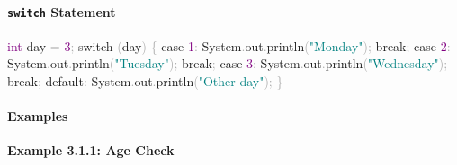 \documentclass[
  justified,
  openright,
]{tufte-book}
\let\subsubsection\paragraph
\let\paragraph\paragraph
\newcommand{\BuiltInTok}[1]{#1}
\newcommand{\ControlFlowTok}[1]{\textcolor{BrandBlue}{#1}}
\newcommand{\DataTypeTok}[1]{\textcolor{Purple}{#1}}
\newcommand{\DecValTok}[1]{\textcolor{Purple}{#1}}
\newcommand{\FunctionTok}[1]{\textcolor{BrandBlue}{#1}}
\newcommand{\KeywordTok}[1]{\textcolor{BrandBlue}{#1}}
\newcommand{\NormalTok}[1]{#1}
\newcommand{\OperatorTok}[1]{\textcolor{DarkGray}{#1}}
\newcommand{\StringTok}[1]{\textcolor{Teal}{#1}}
\newenvironment{Shaded}{%
  \begin{snugshade}
}{%
  \end{snugshade}
}
\let\subsubsection\paragraph
\let\paragraph\paragraph
\begin{document}
\subsubsection{\texorpdfstring{\texttt{switch}
Statement}{switch Statement}}\label{switch-statement}

\begin{Shaded}
\begin{Highlighting}[]
\DataTypeTok{int}\NormalTok{ day }\OperatorTok{=} \DecValTok{3}\OperatorTok{;}
\ControlFlowTok{switch} \OperatorTok{(}\NormalTok{day}\OperatorTok{)} \OperatorTok{\{}
    \ControlFlowTok{case} \DecValTok{1}\OperatorTok{:}
        \BuiltInTok{System}\OperatorTok{.}\FunctionTok{out}\OperatorTok{.}\FunctionTok{println}\OperatorTok{(}\StringTok{"Monday"}\OperatorTok{);}
        \ControlFlowTok{break}\OperatorTok{;}
    \ControlFlowTok{case} \DecValTok{2}\OperatorTok{:}
        \BuiltInTok{System}\OperatorTok{.}\FunctionTok{out}\OperatorTok{.}\FunctionTok{println}\OperatorTok{(}\StringTok{"Tuesday"}\OperatorTok{);}
        \ControlFlowTok{break}\OperatorTok{;}
    \ControlFlowTok{case} \DecValTok{3}\OperatorTok{:}
        \BuiltInTok{System}\OperatorTok{.}\FunctionTok{out}\OperatorTok{.}\FunctionTok{println}\OperatorTok{(}\StringTok{"Wednesday"}\OperatorTok{);}
        \ControlFlowTok{break}\OperatorTok{;}
    \KeywordTok{default}\OperatorTok{:}
        \BuiltInTok{System}\OperatorTok{.}\FunctionTok{out}\OperatorTok{.}\FunctionTok{println}\OperatorTok{(}\StringTok{"Other day"}\OperatorTok{);}
\OperatorTok{\}}
\end{Highlighting}
\end{Shaded}

\subsubsection{Examples}\label{examples-3}

\textbf{Example 3.1.1: Age Check}
\end{document}
